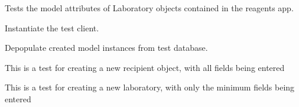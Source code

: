 \documentclass[letterpaper,10pt,english]{sphinxmanual}
\begin{document}

\begin{fulllineitems}
\label{api:experimentdb.sharing.tests.LaboratoryModelTests}
Tests the model attributes of Laboratory objects contained in the reagents app.


\begin{fulllineitems}
\label{api:experimentdb.sharing.tests.LaboratoryModelTests.setUp}
Instantiate the test client.


\end{fulllineitems}


\begin{fulllineitems}
\label{api:experimentdb.sharing.tests.LaboratoryModelTests.tearDown}
Depopulate created model instances from test database.


\end{fulllineitems}


\begin{fulllineitems}
\label{api:experimentdb.sharing.tests.LaboratoryModelTests.test_create_laboratory_all_fields}
This is a test for creating a new recipient object, with all fields being entered


\end{fulllineitems}


\begin{fulllineitems}
\label{api:experimentdb.sharing.tests.LaboratoryModelTests.test_create_laboratory_minimal}
This is a test for creating a new laboratory, with only the minimum fields being entered


\end{fulllineitems}


\end{fulllineitems}
\end{document}
